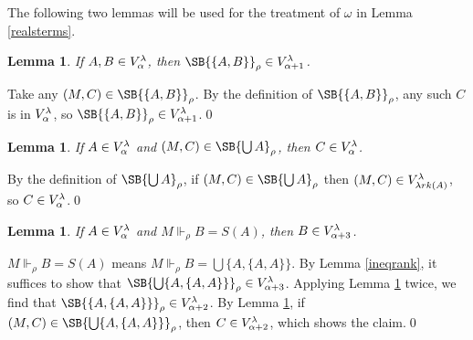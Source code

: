 \documentclass{LMCS}
\newtheorem{lemma}[thm]{Lemma}
\newcommand\reals{\ensuremath{\Vdash}}
\newcommand{\rrho}{\reals_\rho}
\newcommand{\sr}[1]{\ensuremath{\SB{#1}_\rho}}
\newcommand{\lrk}{\ensuremath{\lambda rk}}
\begin{document}
The following two lemmas will be used for the treatment of $\omega$ in Lemma
\ref{realsterms}.

\begin{lemma}\label{realunorderedpair}
If $A, B \in V^{\lambda}_\alpha$, then $\sr{\{ A, B \}} \in \vl_{\alpha + 1}$.
\end{lemma}
\proof Take any $(M, C) \in \sr{\{ A, B \}}$. By the definition of $\sr{\{ A, B
\}}$, any such $C$ is in $V^{\lambda}_\alpha$, so $\sr{ \{ A, B \}} \in \vl_{\alpha + 1}$.\qed


\begin{lemma}\label{union}
If $A \in V^{\lambda}_\alpha$ and $(M, C) \in \sr{\bigcup A}$, then $C \in V^{\lambda}_\alpha$.
\end{lemma}
\proof By the definition of $\sr{\bigcup A}$, if $(M, C) \in \sr{\bigcup A}$ then
$(M, C) \in \vl_{\lrk(A)}$, so $C \in V^{\lambda}_\alpha$.\qed


\begin{lemma}\label{realsucc}
If $A \in V^{\lambda}_\alpha$ and $M \rrho B = S(A)$, then $B \in V^{\lambda}_{\alpha + 3}$.
\end{lemma}
\proof $M \rrho B = S(A)$ means $M \rrho B = \bigcup \{ A, \{ A , A \} \}$.
By Lemma \ref{ineqrank}, it suffices to show that $\sr{\bigcup \{ A, \{ A ,
A \} \}} \in \vl_{\alpha + 3}$. Applying Lemma \ref{realunorderedpair}
twice, we find that $\sr{ \{ A, \{ A , A \} \}} \in \vl_{\alpha + 2}$. By
Lemma \ref{union}, if $(M, C) \in \sr{\bigcup \{ A, \{ A , A \} \}}$, then $C \in V^{\lambda}_{\alpha + 2}$, which
shows the claim.\qed
\end{document}
